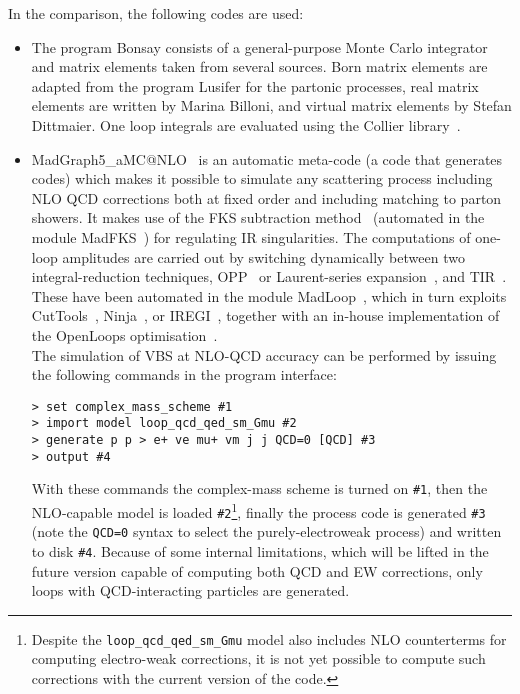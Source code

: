 In the comparison, the following codes are used:

\begin{itemize}

 \item The program {\sc Bonsay} consists of a general-purpose Monte Carlo integrator and matrix elements taken from several sources.
 Born matrix elements are adapted from the program {\sc Lusifer} \cite{Dittmaier:2002ap} for the partonic processes, real matrix elements are written by Marina Billoni, and virtual matrix elements by Stefan Dittmaier.
One loop integrals are evaluated using the {\sc Collier} library~\cite{Denner:2014gla,Denner:2016kdg}.

  \item {\sc MadGraph5\_aMC@NLO}~\cite{Alwall:2014hca} is an automatic meta-code (a code that generates codes) which makes it possible to simulate any scattering process
      including NLO QCD corrections both at fixed order and including matching to parton showers. It makes use of the FKS subtraction method~\cite{Frixione:1995ms,
        Frixione:1997np} (automated in the module {\sc MadFKS}~\cite{Frederix:2009yq,
        Frederix:2016rdc}) for regulating IR singularities. The computations of one-loop amplitudes are carried out by switching dynamically between
        two integral-reduction techniques, OPP~\cite{Ossola:2006us} or Laurent-series expansion~\cite{Mastrolia:2012bu},
        and TIR~\cite{Passarino:1978jh,Davydychev:1991va,Denner:2005nn}. These have been automated in the module {\sc MadLoop}~\cite{Hirschi:2011pa}, which
        in turn exploits {\sc CutTools}~\cite{Ossola:2007ax}, {\sc Ninja}~\cite{Peraro:2014cba,
        Hirschi:2016mdz}, or {\sc IREGI}~\cite{ShaoIREGI},  together with an in-house implementation of the {\sc OpenLoops} optimisation~\cite{Cascioli:2011va}.\\
        The simulation of VBS at NLO-QCD accuracy can be performed by issuing the following commands in the program interface:
\begin{verbatim}
> set complex_mass_scheme #1
> import model loop_qcd_qed_sm_Gmu #2
> generate p p > e+ ve mu+ vm j j QCD=0 [QCD] #3
> output #4
\end{verbatim}
  With these commands the complex-mass scheme is turned on {\tt \#1}, then the NLO-capable model is loaded {\tt \#2}\footnote{Despite
            the {\tt loop\_qcd\_qed\_sm\_Gmu} model also includes NLO counterterms for computing electro-weak corrections, it is not yet possible to compute such corrections
        with the current version of the code.}, finally the process code is generated {\tt \#3} (note the {\tt QCD=0} syntax to select the purely-electroweak process)
        and written to disk {\tt \#4}. Because of some internal limitations, which will be lifted in the future version capable of computing both QCD and EW corrections,
        only loops with QCD-interacting particles are generated.


\end{itemize}
